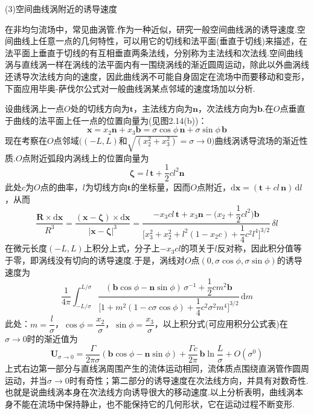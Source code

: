 (3)空间曲线涡附近的诱导速度

在非均匀流场中，常见曲涡管.作为一种近似，研究一般空间曲线涡的诱导速度.空间曲线上任意一点的几何特性，可以用它的切线和法平面(垂直于切线)来描述，在法平面上垂直于切线的有互相垂直两条法线，分别称为主法线和次法线.空间曲线涡与直线涡一样在涡线的法平面内有一围绕涡线的渐近圆周运动，除此以外曲涡线还诱导次法线方向的速度，因此曲线涡不可能自身固定在流场中而要移动和变形，下面应用毕奥-萨伐尔公式对一般曲线涡某点邻域的速度场加以分析.

设曲线涡上一点$O$处的切线方向为$\boldsymbol{t}$，主法线方向为$\boldsymbol{n}$，次法线方向为$\boldsymbol{b}$.在$O$点垂直于曲线的法平面上任一点的位置向量为(见图2.14(b))：
\[
\boldsymbol{x}=x_2\boldsymbol{n}+x_3\boldsymbol{b}=\sigma\cos\phi\,\boldsymbol{n}+\sigma\sin\phi\,\boldsymbol{b}
\]
现在考察在$O$点邻域$((−L,L)$和$\sqrt{(x_2^{2}+x_3^{2})}=\sigma\to 0)$曲线涡诱导流场的渐近性质.$O$点附近弧段内涡线上的位置向量为
\[
\boldsymbol{\zeta}=l\,\boldsymbol{t}+\frac{1}{2}cl^{2}\boldsymbol{n}
\]
此处$c$为$O$点的曲率，$l$为切线方向$\boldsymbol{t}$的坐标量，因而$O$点附近，$\mathrm{d}\boldsymbol{x}=(\boldsymbol{t}+cl\,\boldsymbol{n})\,\mathrm{d}l$，从而
\[
\frac{\boldsymbol{R}\times\mathrm{d}\boldsymbol{x}}{R^{3}}=\frac{(\boldsymbol{x}-\boldsymbol{\zeta})\times\mathrm{d}\boldsymbol{x}}{|\boldsymbol{x}-\boldsymbol{\zeta}|^{3}}=\frac{-x_3cl\,\boldsymbol{t}+x_3\boldsymbol{n}-\Big(x_2+\dfrac{1}{2}cl^{2}\Big)\boldsymbol{b}}{\Big[x_3^{2}+x_2^{2}+l^{2}(1-x_2c)+\dfrac{1}{4}c^{2}l^{4}\Big]^{3/2}}\,\delta l
\]
在微元长度$(-L,L)$上积分上式，分子上$-x_3cl$的项关于$l$反对称，因此积分值等于零，即涡线没有切向的诱导速度.于是，涡线对$O$点$(0,\sigma\cos\phi,\sigma\sin\phi)$的诱导速度为
\[
\frac{1}{4\pi}\int_{-L/\sigma}^{L/\sigma} \frac{(\boldsymbol{b}\cos\phi-\boldsymbol{n}\sin\phi)\,\sigma^{-1}+\dfrac{1}{2}cm^{2}\boldsymbol{b}}{\Big[1+m^{2}(1-c\sigma\cos\phi)+\dfrac{1}{4}c^{2}\sigma^{2}m^{4}\Big]^{3/2}}\,\mathrm{d}m
\]
此处：$m=\dfrac{l}{\sigma}$，$\cos\phi=\dfrac{x_2}{\sigma}$，$\sin\phi=\dfrac{x_3}{\sigma}$，以上积分式(可应用积分公式表)在$\sigma\to 0$时的渐近值为
\begin{equation*}
\boldsymbol{U}_{\sigma\to 0}=\frac{\Gamma}{2\pi\sigma}(\boldsymbol{b}\cos\phi-\boldsymbol{n}\sin\phi)+\frac{\Gamma c}{2\pi}\,\boldsymbol{b}\ln\frac{L}{\sigma}+O(\sigma^{0})
\tag{2.54}
\end{equation*}
上式右边第一部分与直线涡周围产生的流体运动相同，流体质点围绕直涡管作圆周运动，并当$\sigma\to 0$时有奇性；第二部分的诱导速度在次法线方向，并具有对数奇性.也就是说曲线涡本身在次法线方向诱导很大的移动速度.以上分析表明，曲线涡本身不能在流场中保持静止，也不能保持它的几何形状，它在运动过程不断变形.

